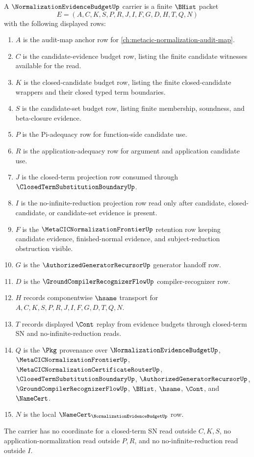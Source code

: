 \begin{definition}
\label{def:normalization-evidence-budget-carrier}
A $\NormalizationEvidenceBudgetUp$ carrier is a finite $\BHist$ packet
$$
E=(A,C,K,S,P,R,J,I,F,G,D,H,T,Q,N)
$$
with the following displayed rows:
\begin{enumerate}
\item $A$ is the audit-map anchor row for \autoref{ch:metacic-normalization-audit-map}.
\item $C$ is the candidate-evidence budget row, listing the finite candidate witnesses available for the read.
\item $K$ is the closed-candidate budget row, listing the finite closed-candidate wrappers and their closed typed term boundaries.
\item $S$ is the candidate-set budget row, listing finite membership, soundness, and beta-closure evidence.
\item $P$ is the Pi-adequacy row for function-side candidate use.
\item $R$ is the application-adequacy row for argument and application candidate use.
\item $J$ is the closed-term projection row consumed through $\ClosedTermSubstitutionBoundaryUp$.
\item $I$ is the no-infinite-reduction projection row read only after candidate, closed-candidate, or candidate-set evidence is present.
\item $F$ is the $\MetaCICNormalizationFrontierUp$ retention row keeping candidate evidence, finished-normal evidence, and subject-reduction obstruction visible.
\item $G$ is the $\AuthorizedGeneratorRecursorUp$ generator handoff row.
\item $D$ is the $\GroundCompilerRecognizerFlowUp$ compiler-recognizer row.
\item $H$ records componentwise $\hsame$ transport for $A,C,K,S,P,R,J,I,F,G,D,T,Q,N$.
\item $T$ records displayed $\Cont$ replay from evidence budgets through closed-term SN and no-infinite-reduction reads.
\item $Q$ is the $\Pkg$ provenance over $\NormalizationEvidenceBudgetUp$, $\MetaCICNormalizationFrontierUp$, $\MetaCICNormalizationCertificateRouterUp$, $\ClosedTermSubstitutionBoundaryUp$, $\AuthorizedGeneratorRecursorUp$, $\GroundCompilerRecognizerFlowUp$, $\BHist$, $\hsame$, $\Cont$, and $\NameCert$.
\item $N$ is the local $\NameCert_{\NormalizationEvidenceBudgetUp}$ row.
\end{enumerate}
The carrier has no coordinate for a closed-term SN read outside $C,K,S$, no application-normalization read outside $P,R$, and no no-infinite-reduction read outside $I$.
\end{definition}

